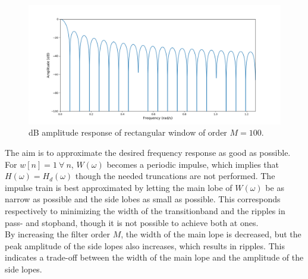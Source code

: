 \begin{figure}[H]
\centering
\includegraphics[width=\textwidth]{figures/dbplots/rect.png}
\caption{dB amplitude response of rectangular window of order $M=100$.}
\label{fig:rect_db}
\end{figure}

%
The aim is to approximate the desired frequency response as good as possible. For $w[n]=1 \ \forall \ n$, $W(\omega)$ becomes a periodic impulse, which implies that $H(\omega) = H_d(\omega)$ though the needed truncations are not performed. The impulse train is best approximated by letting the main lobe of $W(\omega)$ be as narrow as possible and the side lobes as small as possible. This corresponds respectively to minimizing the width of the transitionband and the ripples in pass- and stopband, though it is not possible to achieve both at ones.\\
By increasing the filter order $M$, the width of the main lope is decreased, but the peak amplitude of the side lopes also increases, which results in ripples. This indicates a trade-off between the width of the main lope and the amplitude of the side lopes. \\

